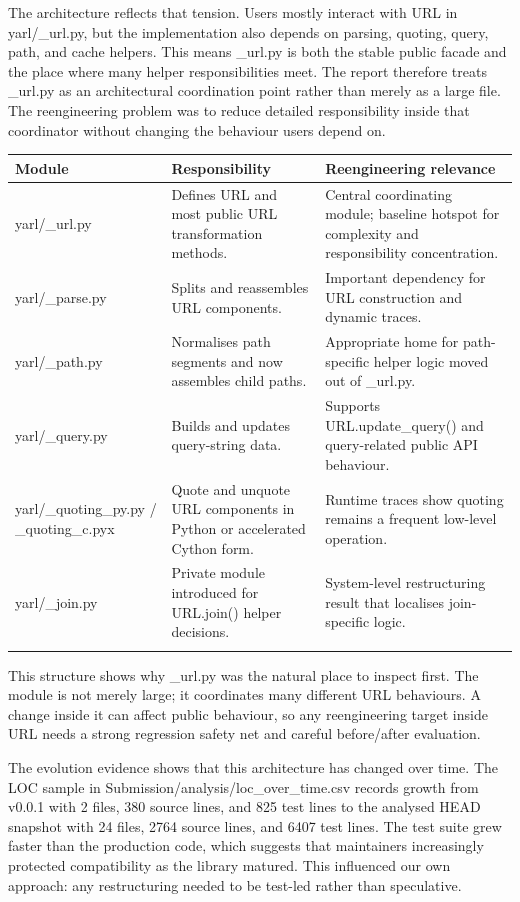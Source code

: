\documentclass[11pt,a4paper]{article}
\begin{document}
The architecture reflects that tension. Users mostly interact with URL in yarl/\_url.py, but the implementation also depends on parsing, quoting, query, path, and cache helpers. This means \_url.py is both the stable public facade and the place where many helper responsibilities meet. The report therefore treats \_url.py as an architectural coordination point rather than merely as a large file. The reengineering problem was to reduce detailed responsibility inside that coordinator without changing the behaviour users depend on.


\begin{longtable}{p{} p{} p{}}
\toprule
Module & Responsibility & Reengineering relevance \\
\midrule
yarl/\_url.py & Defines URL and most public URL transformation methods. & Central coordinating module; baseline hotspot for complexity and responsibility concentration. \\
\addlinespace
yarl/\_parse.py & Splits and reassembles URL components. & Important dependency for URL construction and dynamic traces. \\
\addlinespace
yarl/\_path.py & Normalises path segments and now assembles child paths. & Appropriate home for path-specific helper logic moved out of \_url.py. \\
\addlinespace
yarl/\_query.py & Builds and updates query-string data. & Supports URL.update\_query() and query-related public API behaviour. \\
\addlinespace
yarl/\_quoting\_py.py / \_quoting\_c.pyx & Quote and unquote URL components in Python or accelerated Cython form. & Runtime traces show quoting remains a frequent low-level operation. \\
\addlinespace
yarl/\_join.py & Private module introduced for URL.join() helper decisions. & System-level restructuring result that localises join-specific logic. \\
\addlinespace
\bottomrule
\end{longtable}


This structure shows why \_url.py was the natural place to inspect first. The module is not merely large; it coordinates many different URL behaviours. A change inside it can affect public behaviour, so any reengineering target inside URL needs a strong regression safety net and careful before/after evaluation.


The evolution evidence shows that this architecture has changed over time. The LOC sample in Submission/analysis/loc\_over\_time.csv records growth from v0.0.1 with 2 files, 380 source lines, and 825 test lines to the analysed HEAD snapshot with 24 files, 2764 source lines, and 6407 test lines. The test suite grew faster than the production code, which suggests that maintainers increasingly protected compatibility as the library matured. This influenced our own approach: any restructuring needed to be test-led rather than speculative.
\end{document}
